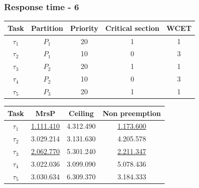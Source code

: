 \documentclass{beamer}
\begin{document}
\begin{frame}
\frametitle{Response time - 6}
  \begin{table}
  \centering
  \begin{tabular}{ccccc}
  \hline\hline
    Task & Partition     & Priority & Critical section & WCET  \\ \hline
    $\tau_1$ & $P_1$  & 20 & 1 & 1 \\
    $\tau_2$ & $P_1$  & 10 & 0 & 3 \\
    $\tau_3$ & $P_2$  & 20 & 1 & 1 \\
    $\tau_4$ & $P_2$  & 10 & 0 & 3 \\
    $\tau_5$ & $P_3$  & 20 & 1 & 1 \\
    \hline
    \end{tabular}
  \end{table}

  \begin{table}
  \centering
  \begin{tabular}{cccc}
  \hline\hline
    Task & MrsP & Ceiling & Non preemption \\ \hline
    $\tau_1$ & \underline{1.111.410} & 4.312.490 & \underline{1.173.600} \\
    $\tau_2$ & 3.029.214 & 3.131.630 & 4.205.578 \\
    $\tau_3$ & \underline{2.062.770} & 5.301.240 & \underline{2.211.347} \\
    $\tau_4$ & 3.022.036 & 3.099.090 & 5.078.436 \\
    $\tau_5$ & 3.030.634 & 6.309.370 & 3.184.333 \\
    \hline
    \end{tabular}
  \end{table}

\end{frame}
\end{document}
